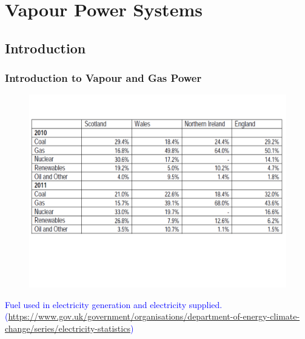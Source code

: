 \documentclass[10pt,compress]{beamer}
\begin{document}
\section{Vapour Power Systems}

\subsection{Introduction}

\begin{frame}
 \frametitle{Introduction to Vapour and Gas Power}
    \begin{figure}%
     \begin{center}
      \includegraphics[width=9.cm,clip]{./Pics/Energy_Share_UK}
     \end{center}
    \end{figure}
\vspace{-2cm}
\textcolor{blue}{Fuel used in electricity generation and electricity supplied. (\href{https://www.gov.uk/government/organisations/department-of-energy-climate-change/series/electricity-statistics}{https://www.gov.uk/government/organisations/department-of-energy-climate-change/series/electricity-statistics})}
 \normalsize
\end{frame}
\end{document}
